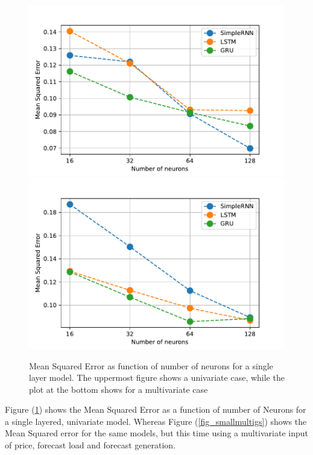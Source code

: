 \documentclass
[twocolumn,
secnumarabic,
nobibnotes,
aps,
prl,
reprint,
groupedaddress,
amsmath,
amssymb,
]{revtex4-2}
\begin{document}
\begin{figure}
  \includegraphics[width=\columnwidth]{figures/small_architecture_grid_search.pdf}
  \includegraphics[width=\columnwidth]{figures/multivariate_forecast_small_architecture_grid_search.pdf}
  \caption{\label{fig_smallgs}Mean Squared Error as function of number of neurons for a single layer model. The uppermost figure shows a univariate case, while the plot at the bottom shows for a multivariate case}
\end{figure}

Figure (\ref{fig_smallgs}) shows the Mean Squared Error as a function of number of Neurons for a single layered, univariate model. Whereas Figure (\ref{fig_smallmultigs}) shows the Mean Squared error for the same models, but this time using a multivariate input of price, forecast load and forecast generation.
\end{document}
